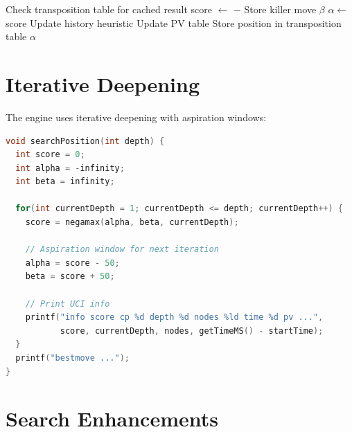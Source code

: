 \documentclass[11pt,a4paper]{report}
\begin{document}
\begin{algorithm}
\caption{Alpha-Beta with Negamax}
\begin{algorithmic}[1]
        \State \Return {}
    \EndIf
        \State {}
    \EndIf
    \State Check transposition table for cached result
        \State {}
        \State score $\gets$ $-$
        \State {}
            \State Store killer move
            \State \Return $\beta$ 
        \EndIf
            \State $\alpha \gets$ score
            \State Update history heuristic
            \State Update PV table
        \EndIf
    \EndFor
    \State Store position in transposition table
    \State \Return $\alpha$
\EndFunction
\end{algorithmic}
\end{algorithm}

\section{Iterative Deepening}

The engine uses iterative deepening with aspiration windows:

\begin{lstlisting}[language=C++]
void searchPosition(int depth) {
  int score = 0;
  int alpha = -infinity;
  int beta = infinity;
  
  for(int currentDepth = 1; currentDepth <= depth; currentDepth++) {
    score = negamax(alpha, beta, currentDepth);
    
    // Aspiration window for next iteration
    alpha = score - 50;
    beta = score + 50;
    
    // Print UCI info
    printf("info score cp %d depth %d nodes %ld time %d pv ...", 
           score, currentDepth, nodes, getTimeMS() - startTime);
  }
  printf("bestmove ...");
}
\end{lstlisting}

\section{Search Enhancements}
\end{document}
